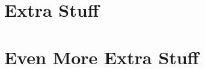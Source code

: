 \usepackage{blindtext}

\appendix


\chapter{Extra Stuff}
\blindtext


\chapter{Even More Extra Stuff}
\blindtext